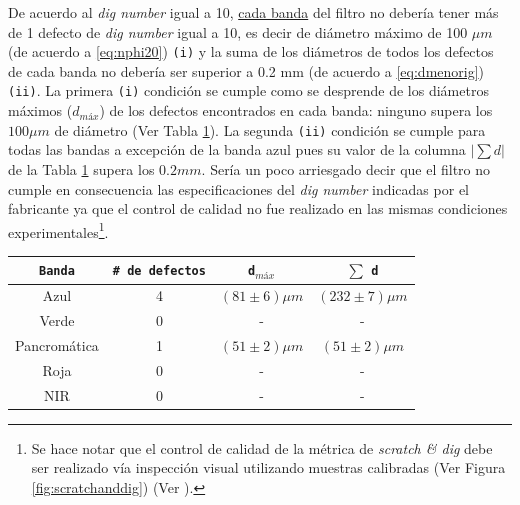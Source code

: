 De acuerdo al \textit{dig number} igual a 10, \underline{cada banda} del filtro no debería tener más de 1 defecto de \textit{dig number} igual a 10, es decir de diámetro máximo de 100 $\mu m$  (de acuerdo a \ref{eq:nphi20}) \texttt{(i)} y la suma de los diámetros de todos los defectos de cada banda no debería ser superior a 0.2 mm (de acuerdo a \ref{eq:dmenorig}) \texttt{(ii)}. La primera \texttt{(i)} condición se cumple como se desprende de los diámetros máximos ($d_{máx}$) de los defectos encontrados en cada banda: ninguno supera los $100 \mu m$ de diámetro (Ver Tabla \ref{tabress}). La segunda \texttt{(ii)} condición se cumple para todas las bandas a excepción de la banda azul pues su valor de la columna $|\sum d |$ de la Tabla \ref{tabress} supera los $0.2 mm$. Sería un poco arriesgado decir que el filtro no cumple en consecuencia las especificaciones del \textit{dig number}  indicadas por el fabricante ya que el control de calidad no fue realizado en las mismas condiciones experimentales\footnote{Se hace notar que el control de calidad de la métrica de \textit{scratch \& dig} debe ser realizado vía inspección visual utilizando muestras calibradas (Ver Figura \ref{fig:scratchanddig}) (Ver \href{https://bit.ly/34cLMTk}{\faYoutubeSquare}).}.
 \begin{table}[H]
\begin{center}
\begin{tabular}{ |c|c|c|c| }    \toprule
\texttt{Banda} & \texttt{\# de defectos} & \texttt{d$_{máx}$} & $\sum$ \texttt{d}\\\midrule
\rowcolor{blue!15} Azul    & 4 & $(81 \pm 6)\mu m$ & $(232 \pm 7)\mu m$   \\ 
\rowcolor{green!50} Verde  & 0 & - & - \\ 
Pancromática& 1 & $(51 \pm 2)\mu m$ & $(51 \pm 2)\mu m$  \\
\rowcolor{red!50} Roja & 0 & -  & -  \\
\rowcolor{maroon!20} NIR & 0 & -  & - \\
\bottomrule
 \hline
\end{tabular}
\end{center}
 \label{tabress}
 \end{table}
